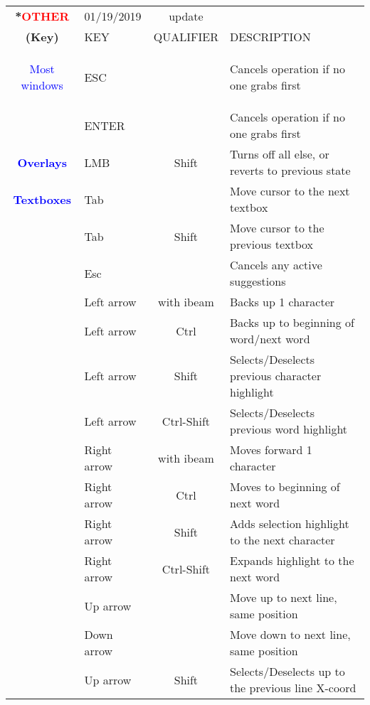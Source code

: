 \begin{center}
    \small 
    \begin{longtable}{ >{\bfseries}c l c p{6cm}}             
        \toprule
        \multirow{2}*{\textcolor{red}{OTHER}} & 01/19/2019 & update & \\
        \noalign{\smallskip}
        \cline{2-4}
        \noalign{\smallskip}
        (Key) & KEY & QUALIFIER & DESCRIPTION\\
        \midrule        
        \endhead   
        
        \textcolor{blue}{Most windows} & ESC &  & Cancels operation if no one grabs first \\                
        & ENTER &  & Cancels operation if no one grabs first \\
        \midrule
        \textcolor{blue}{Overlays} & LMB & Shift & Turns off all else, or reverts to previous state \\
        \midrule
        \textcolor{blue}{Textboxes} & Tab &  & Move cursor to the next textbox \\
        & Tab & Shift & Move cursor to the previous textbox \\        
        & Esc &  & Cancels any active suggestions \\        
        & Left arrow & with ibeam & Backs up 1 character \\        
        & Left arrow & Ctrl & Backs up to beginning of word/next word \\        
        & Left arrow & Shift & Selects/Deselects previous character highlight \\        
        & Left arrow & Ctrl-Shift & Selects/Deselects previous word highlight \\        
        & Right arrow & with ibeam & Moves forward 1 character \\        
        & Right arrow & Ctrl & Moves to beginning of next word \\        
        & Right arrow & Shift & Adds selection highlight to the next character \\        
        & Right arrow & Ctrl-Shift & Expands highlight to the next word \\        
        & Up arrow &  & Move up to next line, same position \\        
        & Down arrow &  & Move down to next line, same position \\        
        & Up arrow & Shift & Selects/Deselects up to the previous line X-coord \\        

\end{longtable}
\end{center}
